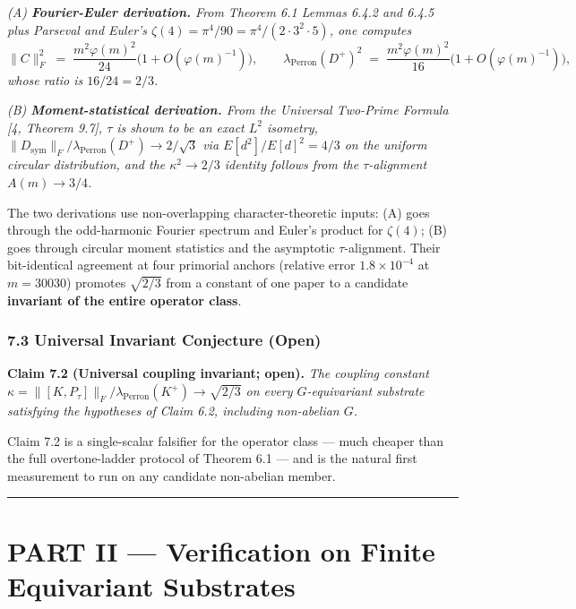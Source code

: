\documentclass[
  11pt,
]{article}
\begin{document}
\emph{(A) \textbf{Fourier-Euler derivation.} From Theorem 6.1 Lemmas
6.4.2 and 6.4.5 plus Parseval and Euler's
\(\zeta(4) = \pi^4/90 = \pi^4/(2 \cdot 3^2 \cdot 5)\), one computes}
\[\|C\|_F^2 \;=\; \frac{m^2 \varphi(m)^2}{24}\bigl(1 + O(\varphi(m)^{-1})\bigr), \qquad \lambda_\text{Perron}(D^+)^2 \;=\; \frac{m^2 \varphi(m)^2}{16}\bigl(1 + O(\varphi(m)^{-1})\bigr), \tag{7.3}\]
\emph{whose ratio is \(16/24 = 2/3\).}

\emph{(B) \textbf{Moment-statistical derivation.} From the Universal
Two-Prime Formula {[}4, Theorem 9.7{]}, \(\tau\) is shown to be an exact
\(L^2\) isometry,
\(\|D_\text{sym}\|_F / \lambda_\text{Perron}(D^+) \to 2/\sqrt{3}\) via
\(E[d^2]/E[d]^2 = 4/3\) on the uniform circular distribution, and the
\(\kappa^2 \to 2/3\) identity follows from the \(\tau\)-alignment
\(A(m) \to 3/4\).}

The two derivations use non-overlapping character-theoretic inputs: (A)
goes through the odd-harmonic Fourier spectrum and Euler's product for
\(\zeta(4)\); (B) goes through circular moment statistics and the
asymptotic \(\tau\)-alignment. Their bit-identical agreement at four
primorial anchors (relative error \(1.8 \times 10^{-4}\) at
\(m = 30030\)) promotes \(\sqrt{2/3}\) from a constant of one paper to a
candidate \textbf{invariant of the entire operator class}.

\subsubsection{7.3 Universal Invariant Conjecture
(Open)}\label{universal-invariant-conjecture-open}

\textbf{Claim 7.2 (Universal coupling invariant; open).} \emph{The
coupling constant
\(\kappa = \|[K, P_\tau]\|_F / \lambda_\text{Perron}(K^+) \to \sqrt{2/3}\)
on every \(G\)-equivariant substrate satisfying the hypotheses of Claim
6.2, including non-abelian \(G\).}

Claim 7.2 is a single-scalar falsifier for the operator class --- much
cheaper than the full overtone-ladder protocol of Theorem 6.1 --- and is
the natural first measurement to run on any candidate non-abelian
member.

\begin{center}\rule{0.5\linewidth}{0.5pt}\end{center}

\section{PART II --- Verification on Finite Equivariant
Substrates}\label{part-ii-verification-on-finite-equivariant-substrates}
\end{document}
